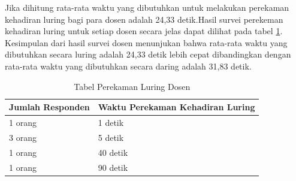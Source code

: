 \begin{enumerate}
	Jika dihitung rata-rata waktu yang dibutuhkan untuk melakukan perekaman kehadiran luring bagi para dosen adalah 24,33 detik.Hasil survei perekeman kehadiran luring untuk setiap dosen secara jelas dapat dilihat pada tabel \ref{tab:luringDosen}. Kesimpulan dari hasil survei dosen menunjukan bahwa rata-rata waktu yang dibutuhkan secara luring adalah 24,33 detik lebih cepat dibandingkan dengan rata-rata waktu yang dibutuhkan secara daring adalah 31,83 detik.
		
	\begin{table}[ht]	\vspace{-0.4cm}
		\caption{Tabel Perekaman Luring Dosen}
		\centering
		\begin{tabular}{|p{4cm} |p{7cm}|}
			\hline
			Jumlah Responden &  Waktu Perekaman Kehadiran Luring \\ \hline     
			1 orang &  1 detik\\ \hline 
			3 orang &  5 detik\\ \hline 
			1 orang &  40 detik\\ \hline 
			1 orang &  90 detik\\ \hline 
		\end{tabular}
		\label{tab:luringDosen}
	\end{table}
\end{enumerate}


